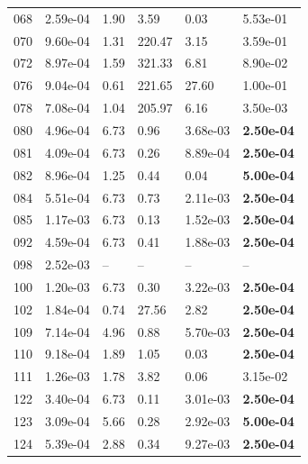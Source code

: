 \begin{figure}[htbp!]
{\begin{minipage}[t]{0.48\linewidth}
\begin{tabular}{llllll}
                    068 & 2.59e-04 & 1.90 & 3.59 & 0.03 & 5.53e-01\\
                    070 & 9.60e-04 & 1.31 & 220.47 & 3.15 & 3.59e-01\\
                    072 & 8.97e-04 & 1.59 & 321.33 & 6.81 & 8.90e-02\\
                    076 & 9.04e-04 & 0.61 & 221.65 & 27.60 & 1.00e-01\\
                    078 & 7.08e-04 & 1.04 & 205.97 & 6.16 & 3.50e-03\\
                    080 & 4.96e-04 & 6.73 & 0.96 & 3.68e-03 & \textbf{2.50e-04}\\
                    081 & 4.09e-04 & 6.73 & 0.26 & 8.89e-04 & \textbf{2.50e-04}\\
                    082 & 8.96e-04 & 1.25 & 0.44 & 0.04 & \textbf{5.00e-04}\\
                    084 & 5.51e-04 & 6.73 & 0.73 & 2.11e-03 & \textbf{2.50e-04}\\
                    085 & 1.17e-03 & 6.73 & 0.13 & 1.52e-03 & \textbf{2.50e-04}\\
                    092 & 4.59e-04 & 6.73 & 0.41 & 1.88e-03 & \textbf{2.50e-04}\\
                    098 & 2.52e-03 & -- & -- & -- & --\\
                    100 & 1.20e-03 & 6.73 & 0.30 & 3.22e-03 & \textbf{2.50e-04}\\
                    102 & 1.84e-04 & 0.74 & 27.56 & 2.82 & \textbf{2.50e-04}\\
                    109 & 7.14e-04 & 4.96 & 0.88 & 5.70e-03 & \textbf{2.50e-04}\\
                    110 & 9.18e-04 & 1.89 & 1.05 & 0.03 & \textbf{2.50e-04}\\
                    111 & 1.26e-03 & 1.78 & 3.82 & 0.06 & 3.15e-02\\
                    122 & 3.40e-04 & 6.73 & 0.11 & 3.01e-03 & \textbf{2.50e-04}\\
                    123 & 3.09e-04 & 5.66 & 0.28 & 2.92e-03 & \textbf{5.00e-04}\\
                    124 & 5.39e-04 & 2.88 & 0.34 & 9.27e-03 & \textbf{2.50e-04}\\
        \bottomrule
        \end{tabular}
    \end{minipage}
    \hspace{0.02\linewidth}
    \begin{minipage}[t]{0.48\linewidth}

\end{minipage}}
\end{figure}
